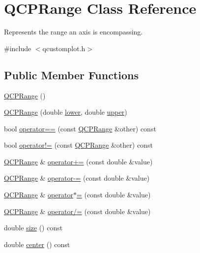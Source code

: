 \hypertarget{classQCPRange}{}\section{Q\+C\+P\+Range Class Reference}
\label{classQCPRange}


Represents the range an axis is encompassing.  




{\ttfamily \#include $<$qcustomplot.\+h$>$}

\subsection*{Public Member Functions}
\begin{DoxyCompactItemize}
\item 
\hyperlink{classQCPRange_aca158d7e69702cee5d77d10a269b01e2}{Q\+C\+P\+Range} ()
\item 
\hyperlink{classQCPRange_a1d9d84d084c8f368fdedd42e0978d405}{Q\+C\+P\+Range} (double \hyperlink{classQCPRange_aa3aca3edb14f7ca0c85d912647b91745}{lower}, double \hyperlink{classQCPRange_ae44eb3aafe1d0e2ed34b499b6d2e074f}{upper})
\item 
bool \hyperlink{classQCPRange_aa20f91509687505e25bd2ef10d2f0e15}{operator==} (const \hyperlink{classQCPRange}{Q\+C\+P\+Range} \&other) const 
\item 
bool \hyperlink{classQCPRange_a9b9016ee83dea60573abb9a5ef4cdbcb}{operator!=} (const \hyperlink{classQCPRange}{Q\+C\+P\+Range} \&other) const 
\item 
\hyperlink{classQCPRange}{Q\+C\+P\+Range} \& \hyperlink{classQCPRange_afea7c1aa7d08f061cd9bd8832f957df8}{operator+=} (const double \&value)
\item 
\hyperlink{classQCPRange}{Q\+C\+P\+Range} \& \hyperlink{classQCPRange_a95894bcb15a16a75ca564091374e2191}{operator-\/=} (const double \&value)
\item 
\hyperlink{classQCPRange}{Q\+C\+P\+Range} \& \hyperlink{classQCPRange_a6876aa9620ff2f0f7f1873f998372cef}{operator$\ast$=} (const double \&value)
\item 
\hyperlink{classQCPRange}{Q\+C\+P\+Range} \& \hyperlink{classQCPRange_a6137d8682b6835ace840730b4c1e2d63}{operator/=} (const double \&value)
\item 
double \hyperlink{classQCPRange_afa57c13049b965edb6fd1c00ac56338a}{size} () const 
\item 
double \hyperlink{classQCPRange_a3825b53cf17da5de0843c1f3baad07db}{center} () const 

\end{DoxyCompactItemize}
